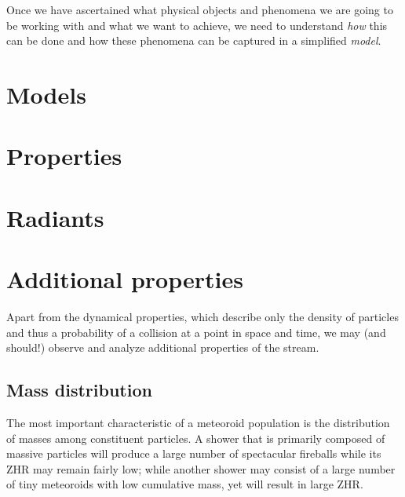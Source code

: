 
Once we have ascertained what physical objects and phenomena we are going to be working with and what we want to achieve,
we need to understand \emph{how} this can be done and how these phenomena can be captured in a simplified \emph{model}.

\section{Models}
    

    \section{Properties} \label{mp}
        \section{Radiants} \label{mpr}

        \section{Additional properties} \label{mpa}
            Apart from the dynamical properties, which describe only the density of particles
            and thus a probability of a collision at a point in space and time,
            we may (and should!) observe and analyze additional properties of the stream.

            \subsection{Mass distribution} \label{mpam}
                The most important characteristic of a meteoroid population is the distribution of masses
                among constituent particles. A shower that is primarily composed of massive particles
                will produce a large number of spectacular fireballs while its ZHR may remain fairly low;
                while another shower may consist of a large number of tiny meteoroids with low cumulative mass,
                yet will result in large ZHR.

